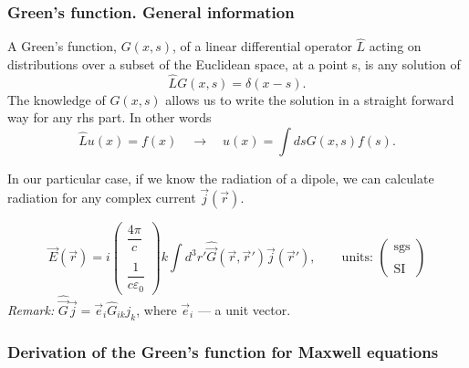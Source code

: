 \subsubsection{Green's function. General information}

A Green's function, $G(x,s)$, of a linear differential operator $\hat{L}$ acting on distributions over a subset of the Euclidean space, at a point s, is any solution of
\begin{equation}
	\hat{L} G(x, s) = \delta(x - s).
\end{equation}
The knowledge of $G(x,s)$ allows us to write the solution in a straight forward way for any rhs part. In other words
\begin{equation}
	\hat{L} u(x) = f(x) \quad \to \quad u(x) = \int ds G(x,s) f(s).
\end{equation}

In our particular case, if we know the radiation of a dipole, we can calculate radiation for any complex current $\vec{j}(\vec{r})$.

\begin{testexample}
	\begin{equation}
		\vec{E}(\vec{r}) = i \begin{pmatrix}
			\dfrac{4 \pi}{c}  \\ \\
			\dfrac{1}{c \varepsilon_0}
		\end{pmatrix} k \int d^3r' \hat{\vec{G}}(\vec{r}, \vec{r}') \vec{j}(\vec{r}'), \qquad \text{units: }\begin{pmatrix}
		\text{sgs}  \\ \\
		\text{SI}
		\end{pmatrix}
		\label{eq:E_from_G}
	\end{equation}
	\textit{Remark:} $\hat{\vec{G}} \vec{j} = \vec{e}_i \hat{G}_{ik} j_k$, where $\vec{e}_i$ --- a unit vector.
\end{testexample}

\subsubsection{Derivation of the Green's function for Maxwell equations}

